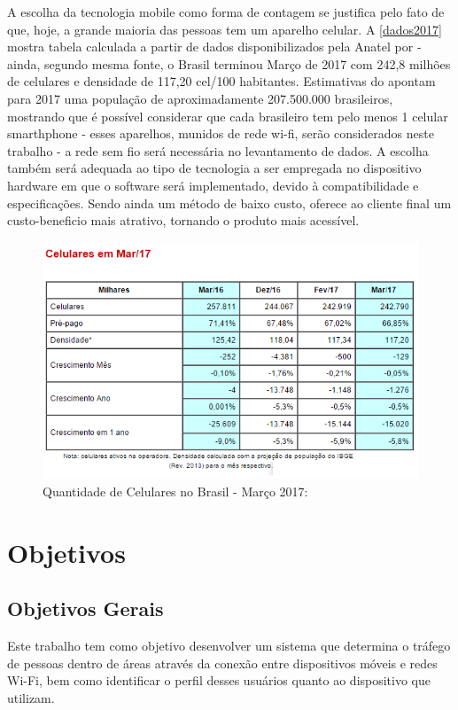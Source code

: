 A escolha da tecnologia mobile como forma de contagem se justifica pelo fato de que, hoje, a grande maioria das pessoas tem um aparelho celular. A \autoref{dados2017} mostra tabela calculada a partir de dados disponibilizados pela Anatel por  - ainda, segundo mesma fonte, o Brasil terminou Março de 2017 com 242,8 milhões de celulares e densidade de 117,20 cel/100 habitantes. Estimativas do  apontam para 2017 uma população de aproximadamente 207.500.000 brasileiros, mostrando que é possível considerar que cada brasileiro tem pelo menos 1 celular smarthphone - esses aparelhos, munidos de rede wi-fi, serão considerados neste trabalho - a rede sem fio será necessária no levantamento de dados. A escolha também será adequada ao tipo de tecnologia a ser empregada no dispositivo hardware em que o software será implementado, devido à compatibilidade e especificações. Sendo ainda um método de baixo custo, oferece ao cliente final um custo-beneficio mais atrativo, tornando o produto mais acessível.

\begin{figure}[htb]
  \caption{\label{dados2017}Quantidade de Celulares no Brasil - Março 2017:}
  \begin{center}
    \includegraphics[width=1.0\textwidth]{img/dados2017.png}
  \end{center}
\end{figure}


\section{Objetivos}
\label{objetivos}

\subsection{Objetivos Gerais}
Este trabalho tem como objetivo desenvolver um sistema que determina o tráfego de pessoas dentro de áreas através da conexão entre dispositivos móveis e redes
Wi-Fi, bem como identificar o perfil desses usuários quanto ao dispositivo que utilizam.


